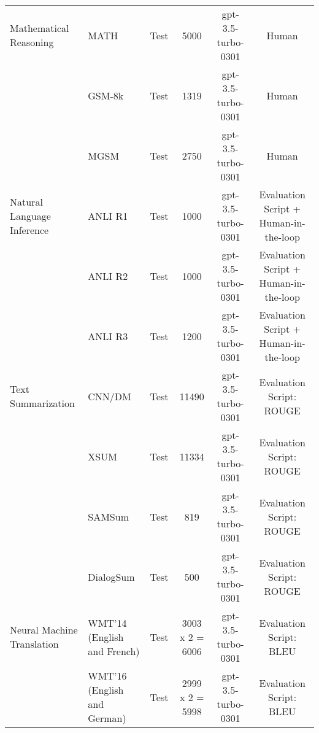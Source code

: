 \documentclass[11pt]{article}
\begin{document}
\begin{table*}
{\begin{tabular}{llcccc}
\midrule

    {Mathematical Reasoning}         & {MATH \cite{hendrycksmath2021}}   & Test &   {5000} & {gpt-3.5-turbo-0301} & {Human} \\

          & {GSM-8k \cite{cobbe2021traininggsm8k}}   &  Test &   {1319} & {gpt-3.5-turbo-0301} & {Human} \\
 & {MGSM \cite{shi2022languagemgsm}}   &  Test &   {2750} & {gpt-3.5-turbo-0301} & {Human} \\


\midrule

  {Natural Language Inference}         & {ANLI R1 \cite{nie-etal-2020-adversarial}}   & Test &   {1000} & {gpt-3.5-turbo-0301} & {Evaluation Script + Human-in-the-loop} \\

          & {ANLI R2 \cite{nie-etal-2020-adversarial}}   &  Test &   {1000} & {gpt-3.5-turbo-0301} & {Evaluation Script + Human-in-the-loop} \\
 & {ANLI R3 \cite{nie-etal-2020-adversarial}}   &  Test &   {1200} & {gpt-3.5-turbo-0301} & {Evaluation Script + Human-in-the-loop} \\


\midrule

  {Text Summarization}         & {CNN/DM \cite{hermann2015teaching}}   & Test &   {11490} & {gpt-3.5-turbo-0301} & {Evaluation Script: ROUGE} \\

          & {XSUM \cite{narayan2018donxsum}}   &  Test &   {11334} & {gpt-3.5-turbo-0301} & {Evaluation Script: ROUGE} \\
 & {SAMSum \cite{gliwa2019samsum}}   &  Test &   {819} & {gpt-3.5-turbo-0301} & {Evaluation Script: ROUGE} \\ 
 & {DialogSum \cite{chen2021dialogsum}}   &  Test &   {500} & {gpt-3.5-turbo-0301} & {Evaluation Script: ROUGE} \\


\midrule

  {Neural Machine Translation}         & {WMT'14 (English and French) \cite{bojar2014findings}}   & Test &   {3003 x 2 = 6006} & {gpt-3.5-turbo-0301} & {Evaluation Script: BLEU} \\

          & {WMT'16 (English and German) \cite{bojar2016findings}}   & Test &   {2999 x 2 = 5998} & {gpt-3.5-turbo-0301} & {Evaluation Script: BLEU} \\


\end{tabular}}
\end{table*}
\end{document}
